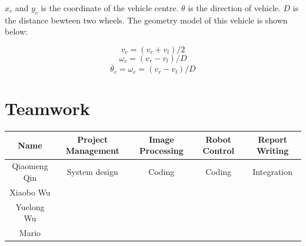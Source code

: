 $x_c$ and $y_c$ is the coordinate of the vehicle centre. $\theta$ is the direction of vehicle. $D$ is the distance bewteen two wheels. The geometry model of this vehicle is shown below:

$$ v_c = (v_r+v_l)/2 $$
$$ \omega_c = ( v_r - v_l ) / D $$
$$ \dot{\theta_c} = \omega_c = ( v_r - v_l ) / D $$

\section{Teamwork}

\begin{table}[h]\footnotesize
\begin{tabular}{c|cccc}
\hline 
Name&Project Management&Image Processing&Robot Control&Report Writing\\
\hline 
Qiaomeng Qin&System design&Coding&Coding&Integration\\
Xiaobo Wu&\\
Yuelong Wu&\\
Mario &\\
\hline 
\end{tabular}
\end{table}


